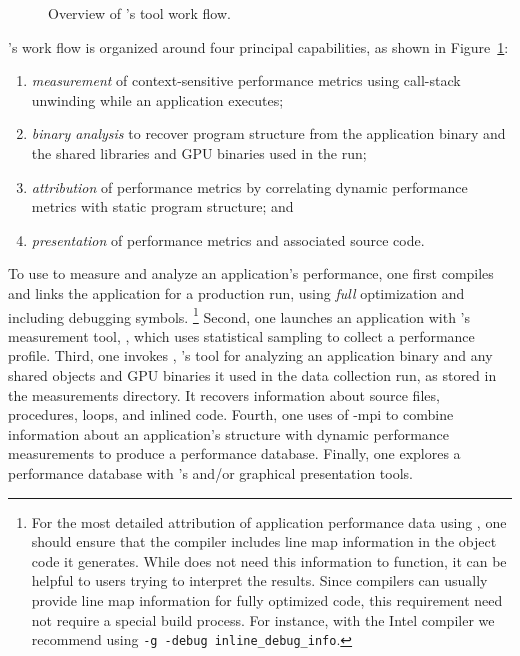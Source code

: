 \documentclass[11pt,twoside,letterpaper]{report}
\begin{document}
\begin{figure}[t]
\caption{Overview of \HPCToolkit{}'s tool work flow.}

\label{fig:hpctoolkit-overview:a}
\end{figure}

\HPCToolkit{}'s work flow is organized around four principal capabilities, as shown in Figure~\ref{fig:hpctoolkit-overview:a}:
\begin{enumerate}
  \item \emph{measurement} of context-sensitive performance metrics using call-stack unwinding
while an application executes;
  \item \emph{binary analysis} to recover program structure from the application binary and the shared libraries
and GPU binaries used in the run;
  \item \emph{attribution} of performance metrics by correlating dynamic performance metrics with static program structure; and
  \item \emph{presentation} of performance metrics and associated source code.
\end{enumerate}

To use \HPCToolkit{} to measure and analyze an application's performance, one first compiles and links the application for a production run, using \emph{full} optimization and including debugging symbols.%
\footnote{%
For the most detailed attribution of application performance data using \HPCToolkit{}, one should ensure that the compiler includes line map information in the object code it generates. While \HPCToolkit{} does not need this information to function, it can be helpful to users trying to interpret the results. Since compilers can usually provide line map information for fully optimized code, this requirement need not require a special build process. For instance, with the Intel compiler we recommend using \texttt{-g -debug inline\_debug\_info}.}
Second, one launches an application with \HPCToolkit{}'s measurement tool, \hpcrun{}, which uses statistical sampling to collect a performance profile.
Third, one invokes \hpcstruct{}, \HPCToolkit{}'s tool for analyzing an application binary and any shared objects and GPU binaries
it used in the data collection run, as stored in the measurements directory.  It recovers
information about source files, procedures, loops, and inlined code.
Fourth, one uses \hpcprof{} of \hpcprof-mpi{} to combine information about an application's structure with dynamic performance measurements to produce a performance database.
Finally, one explores a performance database with \HPCToolkit{}'s \hpcviewer{} and/or \hpctraceviewer{} graphical presentation tools.
\end{document}

